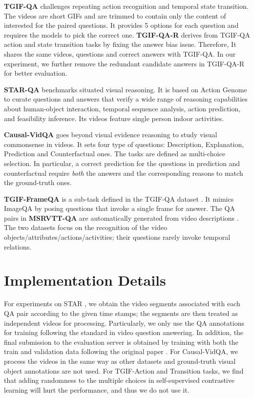 \documentclass[10pt,journal,compsoc]{IEEEtran}
\begin{document}
\noindent \textbf{TGIF-QA} \cite{jang2017tgif} challenges repeating action recognition and temporal state transition. The videos are short GIFs and are trimmed to contain only the content of interested for the paired questions. It provides 5 options for each question and requires the models to pick the correct one. \textbf{TGIF-QA-R} \cite{peng2021progressive} derives from TGIF-QA action and state transition tasks by fixing the answer bias issue. Therefore, It shares the same videos, questions and correct answers with TGIF-QA. In our experiment, we further remove the redundant candidate answers in TGIF-QA-R for better evaluation.

\noindent \textbf{STAR-QA} \cite{wu2021star} benchmarks situated visual reasoning. It is based on Action Genome \cite{ji2020action} to curate questions and answers that verify a wide range of reasoning capabilities about human-object interaction, temporal sequence analysis, action prediction, and feasibility inference. Its videos feature single person indoor activities. 

\noindent \textbf{Causal-VidQA} \cite{li2022representation} goes beyond visual evidence reasoning to study visual commonsense in videos. It sets four type of questions: Description, Explanation, Prediction and Counterfactual ones. The tasks are defined as multi-choice selection. In particular, a correct prediction for the questions in prediction and counterfactual require \emph{both} the answers and the corresponding reasons to match the ground-truth ones. 

\noindent \textbf{TGIF-FrameQA} is a sub-task defined in the TGIF-QA dataset \cite{jang2017tgif}. It mimics ImageQA \cite{antol2015vqa} by posing questions that invoke a single frame for answer. The QA pairs in \textbf{MSRVTT-QA} \cite{xu2017video} are automatically generated from video descriptions \cite{xu2016msr}. The two datasets focus on the recognition of the video objects/attributes/actions/activities; their questions rarely invoke temporal relations. 

\section{Implementation Details}
\label{app:imp}
For experiments on STAR \cite{wu2021star}, we obtain the video segments associated with each QA pair according to the given time stamps; the segments are then treated as independent videos for processing. Particularly, we only use the QA annotations for training following the standard in video question answering. In addition, the final submission to the evaluation server is obtained by training with both the train and validation data following the original paper \cite{wu2021star}. For Causal-VidQA, we process the videos in the same way as other datasets and ground-truth visual object annotations are not used. For TGIF-Action and Transition tasks, we find that adding randomness to the multiple choices in self-supervised contrastive learning will hurt the performance, and thus we do not use it.
\end{document}
